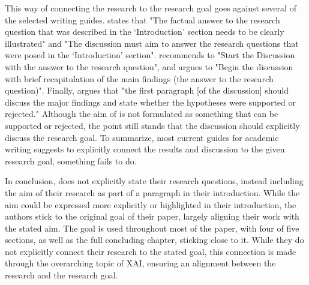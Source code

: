 This way of connecting the research to the research goal goes against several of the selected writing guides. \textcite[p.115]{Cuschieri_2019} states that "The factual answer to the research question that was described in the ‘Introduction’ section needs to be clearly illustrated" and "The discussion must aim to answer the research questions that were posed in the ‘Introduction’ section". \textcite[p.360]{Davidson_2012} recommends to "Start the Discussion with the answer to the research question", and \textcite[p.2]{Jha_2014} argues to "Begin the discussion with brief recapitulation of the main findings (the answer to the research question)". Finally, \textcite[p.84]{Lin_2012} argues that "the first paragraph [of the discussion] should discuss the major findings and state whether the hypotheses were supported or rejected." Although the aim of \textcite{Barredo_2020} is not formulated as something that can be supported or rejected, the point still stands that the discussion should explicitly discuss the research goal. To summarize, most current guides for academic writing suggests to explicitly connect the results and discussion to the given research goal, something \textcite{Barredo_2020} fails to do.

In conclusion, \textcite{Barredo_2020} does not explicitly state their research questions, instead including the aim of their research as part of a paragraph in their introduction. While the aim could be expressed more explicitly or highlighted in their introduction, the authors stick to the original goal of their paper, largely aligning their work with the stated aim. The goal is used throughout most of the paper, with four of five sections, as well as the full concluding chapter, sticking close to it. While they do not explicitly connect their research to the stated goal, this connection is made through the overarching topic of XAI, ensuring an alignment between the research and the research goal.